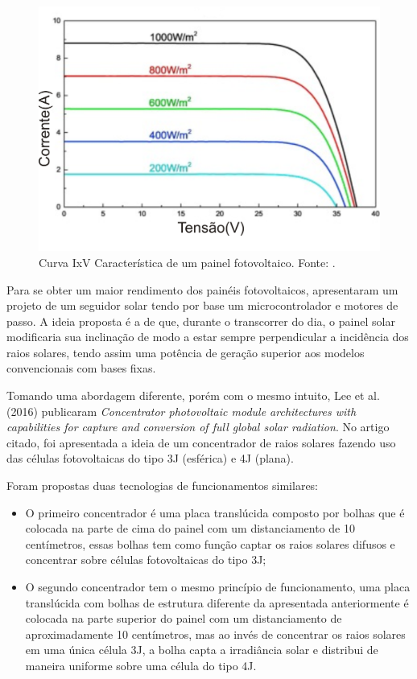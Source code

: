 \FloatBarrier
\begin{figure}[htbp]
	\centering
	\includegraphics[scale=1.3]{imagens/IV_Gao}
	\caption{Curva IxV Característica de um painel fotovoltaico. Fonte:  \cite{GAO201852}.  }
	
	\label{fig:IVGao}
\end{figure}
\FloatBarrier

Para se obter um maior rendimento dos painéis fotovoltaicos,  apresentaram um projeto de um seguidor solar tendo por base um microcontrolador e motores de passo. A ideia proposta é a de que, durante o transcorrer do dia, o painel solar modificaria sua inclinação de modo a estar sempre perpendicular a incidência dos raios solares, tendo assim uma potência de geração superior aos modelos convencionais com bases fixas.

Tomando uma abordagem diferente, porém com o mesmo intuito, Lee et al. (2016) publicaram \textit{Concentrator photovoltaic module architectures with capabilities for capture and conversion of full global solar radiation}. No artigo citado, foi apresentada a ideia de um concentrador de raios solares fazendo uso das células fotovoltaicas do tipo 3J (esférica) e 4J (plana). 

Foram propostas duas tecnologias de funcionamentos similares:

\begin{itemize}
	\item O primeiro concentrador é uma placa translúcida composto por bolhas que é colocada na parte de cima do painel com um distanciamento de 10 centímetros, essas bolhas tem como função captar os raios solares difusos e concentrar sobre células fotovoltaicas do tipo 3J;
	\item O segundo concentrador tem o mesmo princípio de funcionamento, uma placa translúcida com bolhas de estrutura diferente da apresentada anteriormente é colocada na parte superior do painel com um distanciamento de aproximadamente 10 centímetros, mas ao invés de concentrar os raios solares em uma única célula 3J, a bolha capta a irradiância solar e distribui de maneira uniforme sobre uma célula do tipo 4J.
\end{itemize}

